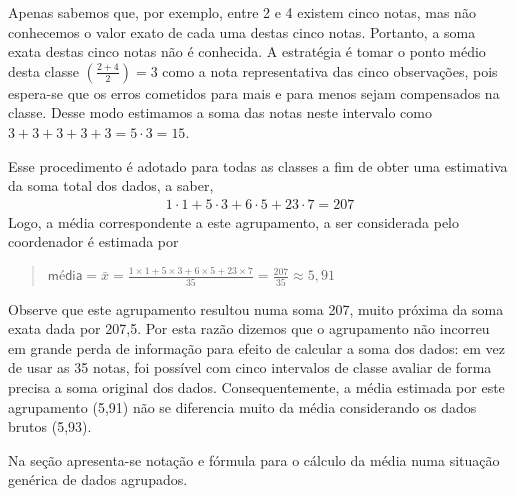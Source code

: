 Apenas sabemos que, por exemplo, entre 2 e 4 existem cinco notas, mas  não conhecemos o valor exato de cada uma destas cinco notas. Portanto, a soma exata destas cinco notas não é conhecida. A estratégia é tomar o ponto médio desta classe \(\left (\frac{2+4}{2}\right )=3\) como a nota representativa das cinco observações, pois espera-se que os erros cometidos para mais e para menos sejam compensados na classe. Desse modo estimamos a soma das notas neste intervalo como \(3+3+3+3+3=5\cdot 3=15\).

Esse procedimento é adotado para todas as classes a fim de obter uma estimativa da soma total dos dados, a saber,
\begin{equation*}
\begin{split}1\cdot 1+5\cdot 3+6\cdot 5+23\cdot 7=207\end{split}
\end{equation*}
Logo, a média correspondente a este agrupamento, a ser considerada pelo coordenador é estimada por
\begin{quote}

\(\textsf{média}=\bar{x}=\frac{1\times 1+5\times 3+6\times 5+23\times 7}{35}=\frac{207}{35}\approx 5,91\)
\end{quote}

Observe que este agrupamento resultou numa soma 207, muito próxima da soma exata dada por 207,5. Por esta razão dizemos que o agrupamento não incorreu em grande perda de informação para efeito de calcular a soma dos dados: em vez de usar as 35 notas, foi possível com cinco intervalos de classe avaliar de forma precisa a soma original dos dados. Consequentemente, a média estimada por este agrupamento (5,91) não se diferencia muito da média considerando os dados brutos (5,93).

Na seção {\hyperref[\detokenize{PE104-A:sec-para-saber-mais}]{}} apresenta-se notação e fórmula para o cálculo da média numa situação genérica de dados agrupados.


